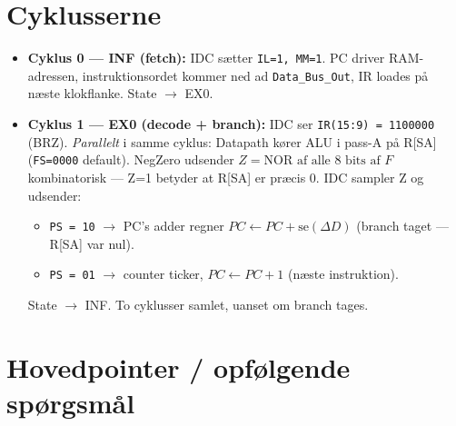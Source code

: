 \documentclass[11pt,a4paper]{article}
\begin{document}
\section*{Cyklusserne}

\begin{itemize}
  \item \textbf{Cyklus 0 --- \textsc{INF} (fetch):}
        IDC sætter \texttt{IL=1, MM=1}.
        PC driver RAM-adressen, instruktionsordet kommer ned ad
        \texttt{Data\_Bus\_Out}, IR loades på næste klokflanke.
        State $\rightarrow$ \textsc{EX0}.

  \item \textbf{Cyklus 1 --- \textsc{EX0} (decode + branch):}
        IDC ser \texttt{IR(15:9) = 1100000} (BRZ).
        \emph{Parallelt} i samme cyklus: Datapath kører ALU i pass-A på
        R[SA] (\texttt{FS=0000} default). NegZero udsender
        \(Z = \text{NOR af alle 8 bits af } F\) kombinatorisk ---
        Z=1 betyder at R[SA] er præcis 0.
        IDC sampler Z og udsender:

        \begin{itemize}
          \item[\(Z = 1\):] \texttt{PS = 10} $\rightarrow$ PC's adder
                regner \(PC \leftarrow PC + \mathrm{se}(\Delta D)\) (branch taget --- R[SA] var nul).
          \item[\(Z = 0\):] \texttt{PS = 01} $\rightarrow$ counter ticker,
                \(PC \leftarrow PC + 1\) (næste instruktion).
        \end{itemize}

        State $\rightarrow$ \textsc{INF}. To cyklusser samlet, uanset om branch tages.
\end{itemize}

\section*{Hovedpointer / opfølgende spørgsmål}
\end{document}
